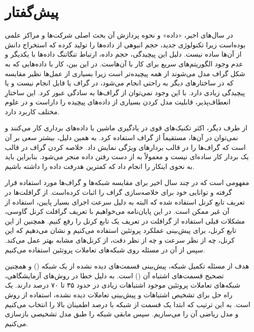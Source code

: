 \chapter*{پیش‌گفتار}

در سال‌های اخیر، «داده» و نحوه پردازش آن بحث اصلی شرکت‌ها و مراکز علمی بوده‌است زیرا تکنولوژی جدید، حجم انبوهی از داده‌ها را تولید کرده که استخراج دانش از آن‌ها سا‌ده نیست. دلیل این پیچیدگی، حجم داده، ارتباط تنگاتنگ داده‌ها با یکدیگر و عدم وجود الگوریتم‌های سریع برای کار با آن‌هاست. در این بین، کار با داده‌هایی که به شکل گراف مدل می‌شوند از همه پیچیده‌تر است زیرا بسیاری از عمل‌ها نظیر مقایسه که در ساختار‌های دیگر به راحتی انجام می‌شود، در گراف یا قابل انجام نیست و یا پیچیدگی زیادی دارد. با این وجود نمی‌توان از گراف‌ها به سادگی عبور کرد. این ساختارِ انعطاف‌پذیر، قابلیت مدل کردن بسیاری از داده‌های پیچیده را داراست و در علوم مختلف کاربرد دارد.

از طرف دیگر، اکثر تکنیک‌های قوی در یادگیری ماشین با داده‌های برداری کار می‌کنند و نمی‌توان در آن‌ها، مستقیماً از گراف‌ استفاده کرد. به همین دلیل، بیشتر سعی بر آن است که گراف‌ها را در قالب بردارهای ویژگی نمایش داد. خلاصه کردن گراف در قالب یک بردار کار ساده‌ای نیست و معمولاً به از دست رفتن داده منجر می‌شود. بنابراین باید به نحوی اینکار را انجام داد که کمترین هدرفت داده را داشته باشیم.

 مفهومی است که در چند سال اخیر برای مقایسه شبکه‌ها و گراف‌ها مورد استفاده قرار گرفته و توانایی خود برای خلاصه‌سازی گراف را اثبات کرده‌است. از گرافلت‌ها در تعریف تابع کرنل استفاده شده که البته به دلیل سرعت اجرای بسیار پایین، استفاده از آن غیر ممکن است. در این پایان‌نامه می‌خواهیم با تعریف گرافلت کرنل گاوسی، مشکلات قبلی استفاده از گرافلت در تعریف یک تابع کرنل را رفع کنیم. همچنین از این تابع کرنل، برای پیش‌بینی عملکرد پروتئین استفاده می‌کنیم و نشان می‌دهیم که این کرنل، چه از نظر سرعت و چه از نظر دقت، از کرنل‌های مشابه بهتر عمل می‌کند. سپس از آن در مسئله  روی شبکه‌های تعاملات پروتئین استفاده می‌کنیم.

هدف از مسئله تکمیل شبکه، پیش‌بینی قسمت‌های دیده نشده از یک شبکه () و همچنین تصحیح قسمت‌های اشتباه آن () است. به دلیل خطا در روش‌های آزمایشگاهی، شبکه‌های تعاملات پروتئین موجود اشتباهات زیادی در حدود ۳۵ تا ۷۰ درصد دارند. یک راه حل برای تشخیص اشتباهات و پیش‌بینی تعاملات دیده نشده، استفاده از روش  است. به این ترتیب که ابتدا یک قسمت از شبکه با درصد اطمینان بالا را انتخاب می‌کنیم و مدل ریاضی آن را می‌سازیم. سپس مابقی شبکه را طبق مدل تشخیصی بازسازی می‌کنیم.
